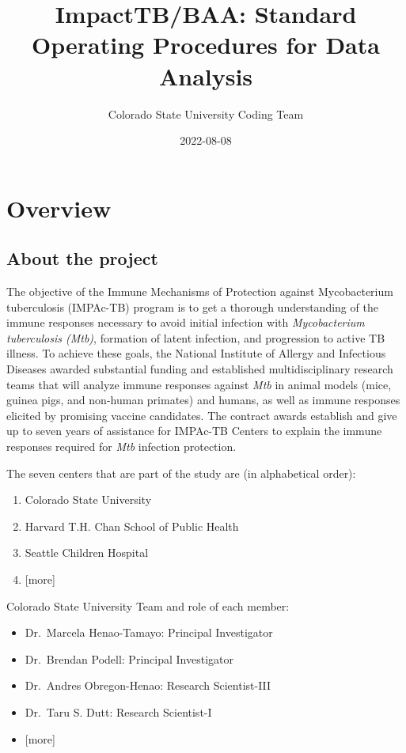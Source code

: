 \documentclass[
]{book}
\title{ImpactTB/BAA: Standard Operating Procedures for Data Analysis}
\author{Colorado State University Coding Team}
\date{2022-08-08}
\providecommand{\tightlist}{%
  \setlength{\itemsep}{0pt}\setlength{\parskip}{0pt}}
\begin{document}
\maketitle

{
\setcounter{tocdepth}{1}
\tableofcontents
}
\hypertarget{overview}{%
\chapter{Overview}\label{overview}}

\hypertarget{about-the-project}{%
\section{About the project}\label{about-the-project}}

The objective of the Immune Mechanisms of Protection against Mycobacterium tuberculosis (IMPAc-TB) program is to get a thorough understanding of the immune responses necessary to avoid initial infection with \emph{Mycobacterium tuberculosis (Mtb)}, formation of latent infection, and progression to active TB illness. To achieve these goals, the National Institute of Allergy and Infectious Diseases awarded substantial funding and established multidisciplinary research teams that will analyze immune responses against \emph{Mtb} in animal models (mice, guinea pigs, and non-human primates) and humans, as well as immune responses elicited by promising vaccine candidates. The contract awards establish and give up to seven years of assistance for IMPAc-TB Centers to explain the immune responses required for \emph{Mtb} infection protection.

The seven centers that are part of the study are (in alphabetical order):

\begin{enumerate}
\def\labelenumi{\arabic{enumi}.}
\tightlist
\item
  Colorado State University
\item
  Harvard T.H. Chan School of Public Health
\item
  Seattle Children Hospital
\item
  {[}more{]}
\end{enumerate}

Colorado State University Team and role of each member:

\begin{itemize}
\tightlist
\item
  Dr.~Marcela Henao-Tamayo: Principal Investigator
\item
  Dr.~Brendan Podell: Principal Investigator
\item
  Dr.~Andres Obregon-Henao: Research Scientist-III
\item
  Dr.~Taru S. Dutt: Research Scientist-I
\item
  {[}more{]}
\end{itemize}
\end{document}
